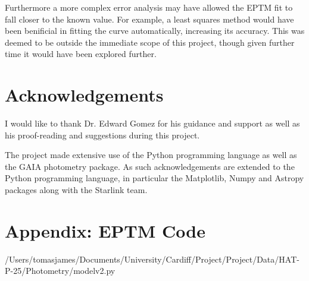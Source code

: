 \documentclass{report}
\begin{document}
Furthermore a more complex error analysis may have allowed the EPTM fit to fall closer to the known value. For example, a least squares method would have been benificial in fitting the curve automatically, increasing its accuracy. This was deemed to be outside the immediate scope of this project, though given further time it would have been explored further.


\section{Acknowledgements}
I would like to thank Dr. Edward Gomez for his guidance and support as well as his proof-reading and suggestions during this project.  

The project made extensive use of the Python programming language as well as the GAIA photometry package. As such acknowledgements are extended to the Python programming language, in particular the Matplotlib, Numpy and Astropy packages along with the Starlink team. 



\nocite{*}
\printbibliography


\appendix
\newpage
\section{Appendix: EPTM Code}


{/Users/tomasjames/Documents/University/Cardiff/Project/Project/Data/HAT-P-25/Photometry/modelv2.py}
\end{document}
